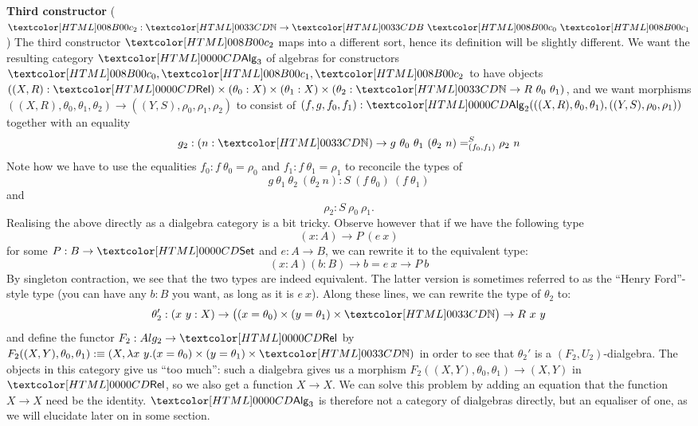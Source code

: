 {\bf Third constructor} ($\Bcii : \natty \to \Bty\ \Aco\ \Aci$) The
third constructor $\Bcii$ maps into a different sort, hence its
definition will be slightly different. We want the resulting category
$\Alg_3$ of algebras for constructors $\Aco, \Aci, \Bcii$ to have
objects
$((X,R) : \Rel) \times (\theta_0 : X) \times (\theta_1 : X) \times
(\theta_2 : \natty \to R\ \theta_0\ \theta_1)$,
and we want morphisms
$((X,R),\theta_0,\theta_1,\theta_2) \to ((Y,S),\rho_0,\rho_1,\rho_2)$
to consist of
$(f,g,f_0,f_1) :
\Alg_2(((X,R),\theta_0,\theta_1),((Y,S),\rho_0,\rho_1))$
together with an equality
$$
g_2 : (n : \natty)  \to \pathover{S}{(f_0,f_1)}{g\ \theta_0\ \theta_1\ (\theta_2\ n)}{\rho_2\ n}
$$
Note how we have to use the equalities $f_0 : f\ \theta_0 = \rho_0$ and
$f_1 : f\ \theta_1 = \rho_1$ to reconcile the types of
$$
g\ \theta_1\ \theta_2\ (\theta_2\ n) : S\ (f\ \theta_0)\ (f\ \theta_1)
$$
and 
$$
\rho_2 : S\ \rho_0\ \rho_1 .
$$
Realising the above directly as a dialgebra category is a bit
tricky. Observe however that if we have the following type
$$
(x : A) \to P\ (e\ x)
$$
for some $P : B \to \Set$ and $e : A \to B$, we can rewrite it to the
equivalent type:
$$
(x : A) (b : B) \to b = e\ x \to P\ b
$$
By singleton contraction, we see that the two types are indeed
equivalent. The latter version is sometimes referred to as the ``Henry
Ford''-style type (you can have any $b : B$ you want, as long as it is
$e\ x$). Along these lines, we can rewrite the type of $\theta_2$ to:
$$
\theta_2' : (x\ y : X) \to \big((x = \theta_0) \times (y = \theta_1) \times \natty\big) \to R\ x\ y 
$$
and define the functor $F_2 : Alg_2 \to \Rel$ by
$F_2 ((X,Y),\theta_0,\theta_1) \ddefeq (X , \lambda x\ y . (x =
\theta_0) \times (y = \theta_1) \times \natty)$
in order to see that $\theta_2'$ is a $(F_2,U_2)$-dialgebra. The
objects in this category give us ``too much'': such a dialgebra gives
us a morphism $F_2((X,Y),\theta_0,\theta_1) \to (X,Y)$ in $\Rel$, so
we also get a function $X \to X$. We can solve this problem by adding
an equation that the function $X \to X$ need be the identity. $\Alg_3$
is therefore not a category of dialgebras directly, but an equaliser
of one, as we will elucidate later on in some section.

